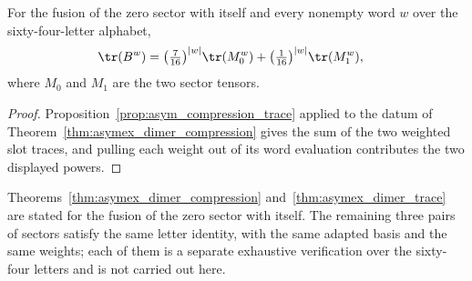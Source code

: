 \begin{theorem}
    \label{thm:asymex_dimer_trace}
    \leanok
    For the fusion of the zero sector with itself and every nonempty word
    $w$ over the sixty-four-letter alphabet,
    \begin{align}
        \tr(B^w)
         & =\bigl(\tfrac{7}{16}\bigr)^{|w|}\tr(M_0^w)
        +\bigl(\tfrac{1}{16}\bigr)^{|w|}\tr(M_1^w),
        \label{eq:asymex_dimer_trace}
    \end{align}
    where $M_0$ and $M_1$ are the two sector tensors.
\end{theorem}

\begin{proof}
    \leanok
    Proposition~\ref{prop:asym_compression_trace} applied to the datum of
    Theorem~\ref{thm:asymex_dimer_compression} gives the sum of the two
    weighted slot traces, and pulling each weight out of its word
    evaluation contributes the two displayed powers.
\end{proof}

\begin{remark}
    \label{rem:asymex_dimer_scope}
    Theorems~\ref{thm:asymex_dimer_compression}
    and~\ref{thm:asymex_dimer_trace} are stated for the fusion of the zero
    sector with itself. The remaining three pairs of sectors satisfy the
    same letter identity, with the same adapted basis and the same weights;
    each of them is a separate exhaustive verification over the
    sixty-four letters and is not carried out here.
\end{remark}
